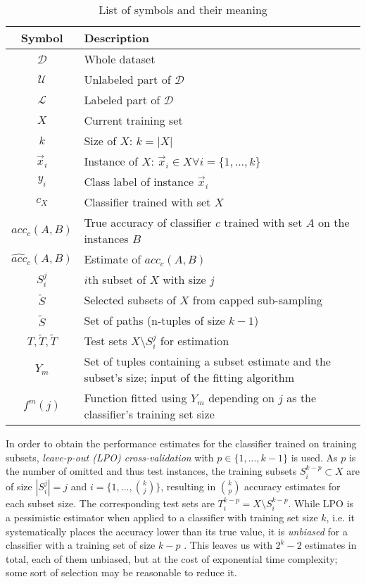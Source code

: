 \begin{table}[h]
\centering
\begin{tabular}{c | C{8cm}}
Symbol & Description\\
\hline
$\mathcal{D}$ & Whole dataset\\
$\mathcal{U}$ & Unlabeled part of $\mathcal{D}$\\
$\mathcal{L}$ & Labeled part of $\mathcal{D}$\\
$X$ & Current training set\\
$k$ & Size of $X$: $k = |X|$\\
$\vec{x}_i$ & Instance of $X$: $\vec{x}_i \in X \forall i=\{1,...,k\}$\\
$y_i$ & Class label of instance $\vec{x}_i$\\
$c_X$ & Classifier trained with set $X$\\
$acc_c(A,B)$ & True accuracy of classifier $c$ trained with set $A$ on the instances $B$\\
$\widehat{acc}_c(A,B)$ & Estimate of $acc_c(A,B)$\\
$S^j_i$ & $i$th subset of $X$ with size $j$\\
$\check{S}$ & Selected subsets of $X$ from capped sub-sampling\\
$\tilde{S}$ & Set of paths (n-tuples of size $k-1$)\\
$T, \check{T}, \tilde{T}$ & Test sets $X \setminus S^j_i$ for estimation\\
$Y_m$ & Set of tuples containing a subset estimate and the subset's size; input of the fitting algorithm\\
$f^m(j)$ & Function fitted using $Y_m$ depending on $j$ as the classifier's training set size\\
\end{tabular}
\caption{List of symbols and their meaning}
\label{tab:tos}
\end{table}

In order to obtain the performance estimates for the classifier trained on training subsets, \textit{leave-p-out (LPO) cross-validation} with $p \in \{1,...,k-1\}$ is used. As $p$ is the number of omitted and thus test instances, the training subsets $S^{k-p}_i \subset X$ are of size $|S^j_i| = j$ and $i = \{1,...,{k \choose j}\}$, resulting in ${k \choose p}$ accuracy estimates for each subset size. The corresponding test sets are $T^{k-p}_i = X \setminus S^{k-p}_i$. While LPO is a pessimistic estimator when applied to a classifier with training set size $k$, i.e. it systematically places the accuracy lower than its true value, it is \textit{unbiased} for a classifier with a training set of size $k-p$ \cite{RodriguezEtAl2013}. This leaves us with $2^k-2$ estimates in total, each of them unbiased, but at the cost of exponential time complexity; some sort of selection may be reasonable to reduce it.

